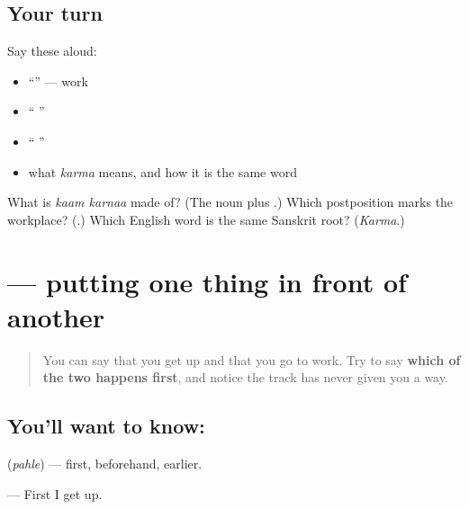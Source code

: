 \subsection*{Your turn}
Say these aloud:

\begin{itemize}
\raggedright
  \item \textquotedblleft{}\textquotedblright{} — work
  \item \textquotedblleft{}    \textquotedblright{}
  \item \textquotedblleft{}      \textquotedblright{}
  \item what \emph{karma} means, and how it is the same word
\end{itemize}

\begin{tcolorbox}[breakable,colback=teal!4,colframe=teal!35!black,title={Before you move on}]
What is \emph{kaam karnaa} made of? (The noun \textbf{} plus \textbf{}.) Which postposition marks the workplace? (\textbf{}.) Which English word is the same Sanskrit root? (\emph{Karma}.)
\end{tcolorbox}
\section[\texorpdfstring{\hi{पहले} (pahle)}{पहले (pahle)}]{ — putting one thing in front of another}

\label{lesson:HI-C90-pahle}



\begin{quote}
You can say that you get up and that you go to work. Try to say \textbf{which of the two happens first}, and notice the track has never given you a way.
\end{quote}

\subsection*{You'll want to know: }
\textbf{} (\emph{pahle}) — first, beforehand, earlier.

\textbf{   } — First I get up.

